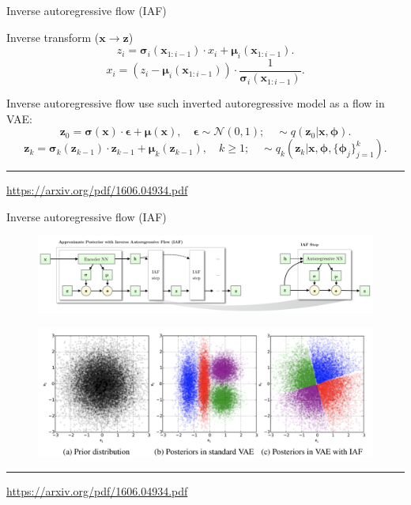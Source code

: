 \documentclass{beamer}
\newcommand{\bx}{\mathbf{x}}
\newcommand{\bz}{\mathbf{z}}
\newcommand{\bepsilon}{\boldsymbol{\epsilon}}
\newcommand{\bmu}{\boldsymbol{\mu}}
\newcommand{\bsigma}{\boldsymbol{\sigma}}
\newcommand{\bphi}{\boldsymbol{\phi}}
\begin{document}
\begin{frame}{Inverse autoregressive flow (IAF)}
	
	\begin{block}{Inverse transform ($\bx \rightarrow \bz$)}
		\vspace{-0.2cm}
		\[
		z_i = \bsigma_i (\bx_{1:i-1}) \cdot x_i + \bmu_i(\bx_{1:i-1}).
		\]
		\[
		x_i = \left( z_i - \bmu_i(\bx_{1:i-1})\right) \cdot \frac{1}{\bsigma_i (\bx_{1:i-1})}.
		\]
		\vspace{-0.3cm}
	\end{block}
	Inverse autoregressive flow use such inverted autoregressive model as a flow in VAE:
	\[
	\bz_0 = \bsigma(\bx) \cdot \bepsilon + \bmu(\bx), \quad \bepsilon \sim \mathcal{N}(0, 1); \quad  \sim q(\bz_0 | \bx, \bphi).
	\]
	\[
	\bz_k = \bsigma_k(\bz_{k - 1}) \cdot \bz_{k-1} + \bmu_k(\bz_{k - 1}), \quad k \geq 1; \quad  \sim q_k(\bz_k | \bx, \bphi, \{\bphi_j\}_{j=1}^k).
	\]
	\vfill
	\hrule\medskip
	{\scriptsize \href{https://arxiv.org/pdf/1606.04934.pdf}{https://arxiv.org/pdf/1606.04934.pdf}} 
\end{frame}
\begin{frame}{Inverse autoregressive flow (IAF)}
	\begin{figure}
		\includegraphics[width=\linewidth]{figs/iaf2.png}
	\end{figure}
	\begin{figure}
		\includegraphics[width=\linewidth]{figs/iaf1.png}
	\end{figure}
	\vfill
	\hrule\medskip
	{\scriptsize \href{https://arxiv.org/pdf/1606.04934.pdf}{https://arxiv.org/pdf/1606.04934.pdf}} 
\end{frame}
\end{document}

